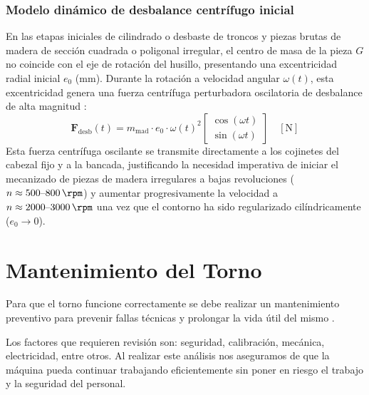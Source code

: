 \documentclass[12pt,a4paper]{article}
\begin{document}
\subsubsection{Modelo dinámico de desbalance centrífugo inicial}
En las etapas iniciales de cilindrado o desbaste de troncos y piezas brutas de madera de sección cuadrada o poligonal irregular, el centro de masa de la pieza $G$ no coincide con el eje de rotación del husillo, presentando una excentricidad radial inicial $e_0$ ($\si{\milli\meter}$). Durante la rotación a velocidad angular $\omega(t)$, esta excentricidad genera una fuerza centrífuga perturbadora oscilatoria de desbalance de alta magnitud \cite{hibbeler2016}:
\begin{equation}
    \mathbf{F}_{\text{desb}}(t) = m_{\text{mad}} \cdot e_0 \cdot \omega(t)^2 \begin{bmatrix} \cos(\omega t) \\ \sin(\omega t) \end{bmatrix} \quad [\si{\newton}]
    \label{eq:fuerza_desbalance}
\end{equation}
Esta fuerza centrífuga oscilante se transmite directamente a los cojinetes del cabezal fijo y a la bancada, justificando la necesidad imperativa de iniciar el mecanizado de piezas de madera irregulares a bajas revoluciones ($n \approx 500\text{--}800\,\si{\rpm}$) y aumentar progresivamente la velocidad a $n \approx 2000\text{--}3000\,\si{\rpm}$ una vez que el contorno ha sido regularizado cilíndricamente ($e_0 \to 0$).

\vspace{4pt}
\noindent{\color{utablue!30}\rule{\textwidth}{0.5pt}}
\vspace{2pt}
\section{Mantenimiento del Torno}
\label{sec:mantenimiento}

Para que el torno funcione correctamente se debe realizar un mantenimiento preventivo para prevenir fallas técnicas y prolongar la vida útil del mismo \cite{tecnomaquinaria}.

Los factores que requieren revisión son: seguridad, calibración, mecánica, electricidad, entre otros. Al realizar este análisis nos aseguramos de que la máquina pueda continuar trabajando eficientemente sin poner en riesgo el trabajo y la seguridad del personal.
\end{document}
